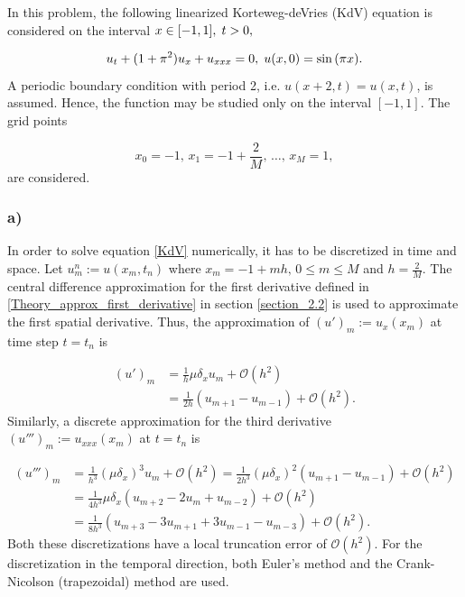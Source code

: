 In this problem, the following linearized Korteweg-deVries (KdV) equation is considered on the interval $x \in [-1, 1], \hspace{1mm} t > 0, $

\begin{equation}
\label{KdV}
    u_t + (1+\pi^2)u_x + u_{xxx} = 0, \hspace{1mm} u(x,0) = \sin{(\pi x)}.
\end{equation}
A periodic boundary condition with period 2, i.e. $u(x+2, t) = u(x,t)$, is assumed. Hence, the function may be studied only on the interval $[-1, 1]$. The grid points

\begin{equation*}
    x_0 = -1, \, x_1 = -1 + \frac{2}{M}, \, \dots, \, x_M = 1,
\end{equation*}
are considered.

\subsubsection{a)}
In order to solve equation \eqref{KdV} numerically, it has to be discretized in time and space. Let $u_m^n := u(x_m,t_n)$ where $x_m=-1+mh \text{,  } 0 \leq m \leq M$ and $h=\frac{2}{M}$. The central difference approximation for the first derivative defined in \eqref{Theory_approx_first_derivative} in section \ref{section_2.2} is used to approximate the first spatial derivative. Thus, the approximation of $(u')_m:=u_x(x_m)$ at time step $t=t_n$ is

\begin{equation}
\begin{split}
\label{task4firstdisc}
 (u')_m &= \frac{1}{h} \mu \delta_x u_m + \mathcal{O}(h^2) \\ &= \frac{1}{2h} \left(u_{m+1} - u_{m-1}\right) + \mathcal{O}(h^2).
\end{split}
\end{equation}
Similarly, a discrete approximation for the third derivative $(u''')_m:=u_{xxx}(x_m)$ at $t=t_n$ is

\begin{equation}
\begin{split}
\label{task4thirdisc}
 (u''')_m &= \frac{1}{h^3} (\mu \delta_x)^3 u_m + \mathcal{O}(h^2) = \frac{1}{2h^3} (\mu \delta_x)^2 \left(u_{m+1}-u_{m-1}\right) + \mathcal{O}(h^2) \\ &= \frac{1}{4h^3} \mu \delta_x \left(u_{m+2}-2u_m + u_{m-2}\right) + \mathcal{O}(h^2) \\ &= \frac{1}{8h^3} \left(u_{m+3}-3u_{m+1}+3u_{m-1}-u_{m-3}\right) + \mathcal{O}(h^2). 
\end{split}
\end{equation}
Both these discretizations have a local truncation error of $\mathcal{O}(h^2)$. For the discretization in the temporal direction, both Euler's method and the Crank-Nicolson (trapezoidal) method are used. \newline

